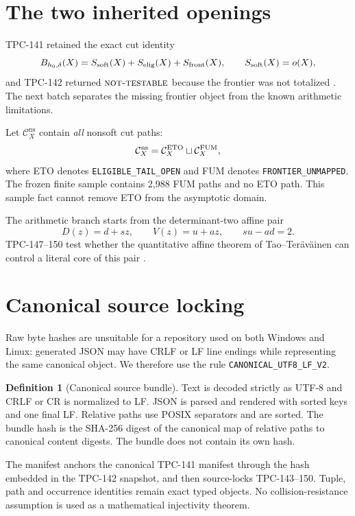 \documentclass[11pt]{article}
\theoremstyle{definition}
\newtheorem{definition}[theorem]{Definition}
\theoremstyle{remark}
\newcommand{\NT}{\textnormal{\textsc{not-testable}}}
\newcommand{\Bhard}{B_{h_0,\delta}}
\newcommand{\Cns}{\mathcal C_X^{\mathrm{ns}}}
\begin{document}
\section{The two inherited openings}

TPC-141 retained the exact cut identity
\[
 \Bhard(X)=S_{\rm soft}(X)+S_{\rm elig}(X)+S_{\rm front}(X),
 \qquad S_{\rm soft}(X)=o(X),
\]
and TPC-142 returned \(\NT\) because the frontier was not totalized
\citep{WangTPC141,WangTPC142}.  The next batch separates the missing
frontier object from the known arithmetic limitations.

Let \(\Cns\) contain \emph{all} nonsoft cut paths:
\[
 \Cns=
 \mathcal C_X^{\rm ETO}\sqcup\mathcal C_X^{\rm FUM},
\]
where ETO denotes \texttt{ELIGIBLE\_TAIL\_OPEN} and FUM denotes
\texttt{FRONTIER\_UNMAPPED}.  The frozen finite sample contains
2,988 FUM paths and no ETO path.  This sample fact cannot remove ETO
from the asymptotic domain.

The arithmetic branch starts from the determinant-two affine pair
\[
 D(z)=d+sz,\qquad V(z)=u+az,\qquad su-ad=2.
\]
TPC-147--150 test whether the quantitative affine theorem of
Tao--Ter\"av\"ainen can control a literal core of this pair
\citep{TaoTeravainen2026,WangTPC147,WangTPC148,WangTPC149,WangTPC150}.

\section{Canonical source locking}

Raw byte hashes are unsuitable for a repository used on both Windows
and Linux: generated JSON may have CRLF or LF line endings while
representing the same canonical object.  We therefore use the rule
\texttt{CANONICAL\_UTF8\_LF\_V2}.

\begin{definition}[Canonical source bundle]
Text is decoded strictly as UTF-8 and CRLF or CR is normalized to LF.
JSON is parsed and rendered with sorted keys and one final LF.
Relative paths use POSIX separators and are sorted.  The bundle hash
is the SHA-256 digest of the canonical map of relative paths to
canonical content digests.  The bundle does not contain its own hash.
\end{definition}

The manifest anchors the canonical TPC-141 manifest through the hash
embedded in the TPC-142 snapshot, and then source-locks TPC-143--150.
Tuple, path and occurrence identities remain exact typed objects.
No collision-resistance assumption is used as a mathematical
injectivity theorem.
\end{document}
